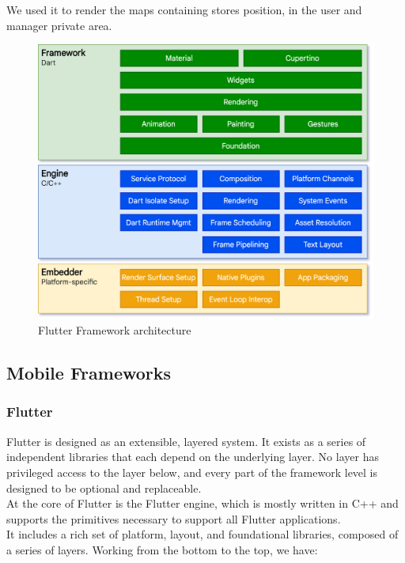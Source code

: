 \documentclass[table, 12pt]{article}
\begin{document}
We used it to render the maps containing stores position, in the user and manager private area.
\newpage
\begin{figure}[H]
    \includegraphics[width=\textwidth]{assets/FlutterArchitecture.png}
    \caption{Flutter Framework architecture}
    \label{spring_architecture}
\end{figure}
\subsection{Mobile Frameworks}
\subsubsection{Flutter}
Flutter is designed as an extensible, layered system. It exists as a series of independent libraries that each depend on the underlying layer. No layer has privileged access to the layer below, and every part of the framework level is designed to be optional and replaceable.\\
At the core of Flutter is the Flutter engine, which is mostly written in C++ and supports the primitives necessary to support all Flutter applications.\\
It includes a rich set of platform, layout, and foundational libraries, composed of a series of layers. Working from the bottom to the top, we have:
\end{document}
